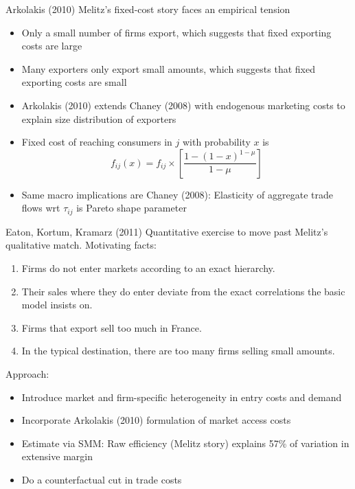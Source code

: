 \documentclass[10pt,notes=hide]{beamer}
\begin{document}
\begin{frame}{Arkolakis (2010)}
Melitz's fixed-cost story faces an empirical tension
\begin{itemize}
	\item Only a small number of firms export, which suggests that fixed exporting costs are large
	\item Many exporters only export small amounts, which suggests that fixed exporting costs are small
	\item Arkolakis (2010) extends Chaney (2008) with endogenous marketing costs to explain size distribution of exporters
	\item Fixed cost of reaching consumers in $j$ with probability $x$ is
	$$
	f_{ij}(x) = f_{ij} \times \left[\frac{1-(1-x)^{1-\mu}}{1-\mu}\right]
	$$
	\item Same macro implications are Chaney (2008): Elasticity of aggregate trade flows wrt $\tau_{ij}$ is Pareto shape parameter
\end{itemize}
\end{frame}
\begin{frame}{Eaton, Kortum, Kramarz (2011)}
Quantitative exercise to move past Melitz's qualitative match. Motivating facts:
\begin{enumerate}
	\item Firms do not enter markets according to an exact hierarchy. 
	\item Their sales where they do enter deviate from the exact correlations the basic model insists on.
	\item Firms that export sell too much in France. 
	\item In the typical destination, there are too many firms selling small amounts.
\end{enumerate}
Approach:
\begin{itemize}
	\item Introduce market and firm-specific heterogeneity in entry costs and demand
	\item Incorporate Arkolakis (2010) formulation of market access costs
	\item Estimate via SMM: Raw efficiency (Melitz story) explains 57\% of variation in extensive margin
	\item Do a counterfactual cut in trade costs
\end{itemize}
\end{frame}
\end{document}
